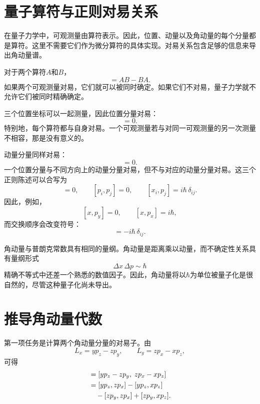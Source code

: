 \section{量子算符与正则对易关系}

在量子力学中，可观测量由算符表示。因此，位置、动量以及角动量的每个分量都是算符。这里不需要它们作为微分算符的具体实现。对易关系包含足够的信息来导出角动量谱。

对于两个算符\(A\)和\(B\)，
\begin{equation}
[A,B]=AB-BA.
\end{equation}
如果两个可观测量对易，它们就可以被同时确定。如果它们不对易，量子力学就不允许它们被同时精确确定。

三个位置坐标可以一起测量，因此位置分量对易：
\begin{equation}
[x_i,x_j]=0.
\end{equation}
特别地，每个算符都与自身对易。一个可观测量若与对同一可观测量的另一次测量不相容，那是没有意义的。

动量分量同样对易：
\begin{equation}
[p_i,p_j]=0.
\end{equation}
一个位置分量与不同方向上的动量分量对易，但不与对应的动量分量对易。这三个正则陈述可以合写为
\begin{equation}
[x_i,x_j]=0,\qquad
[p_i,p_j]=0,\qquad
[x_i,p_j]=i\hbar\,\delta_{ij}.
\end{equation}
因此，例如，
\[
[x,p_y]=0,\qquad [x,p_x]=i\hbar,
\]
而交换顺序会改变符号：
\begin{equation}
[p_j,x_i]=-i\hbar\,\delta_{ij}.
\end{equation}

角动量与普朗克常数具有相同的量纲。角动量是距离乘以动量，而不确定性关系具有量纲形式
\begin{equation}
\Delta x\,\Delta p\sim\hbar
\end{equation}
精确不等式中还差一个熟悉的数值因子。因此，角动量将以\(\hbar\)为单位被量子化是很自然的，尽管这种量子化尚未导出。

\section{推导角动量代数}

第一项任务是计算两个角动量分量的对易子。由
\[
L_x=yp_z-zp_y,\qquad
L_y=zp_x-xp_z,
\]
可得
\begin{align}
[L_x,L_y]
&=[yp_z-zp_y,\;zp_x-xp_z] \\
&=[yp_z,zp_x]-[yp_z,xp_z] \notag\\
&\quad{}-[zp_y,zp_x]+[zp_y,xp_z].
\end{align}

